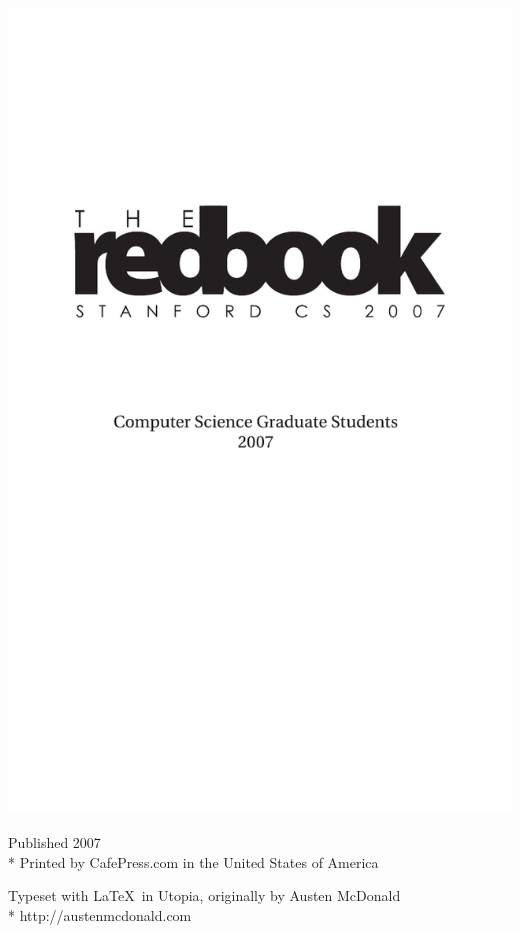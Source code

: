 \documentclass[10pt]{book}
\newenvironment{fullpage}{%
  \begin{list}{}{%
    \setlength{\topmargin}{-1in}
    \setlength{\textheight}{8in}
    \setlength{\topsep}{0pt}%
    \setlength{\leftmargin}{-.6in}%
    \setlength{\listparindent}{\parindent}%
    \setlength{\itemindent}{\parindent}%
    \setlength{\parsep}{\parskip}%
  }%
  \item[]}{\end{list}}
\begin{document}
\thispagestyle{empty}
\mbox{}
\newpage

\thispagestyle{empty}
\begin{fullpage}
\includegraphics{2007-redbook-titlepage.pdf}
\end{fullpage}
\vfil\eject

\vspace*{5in}
{\small
\noindent Published 2007\\*
Printed by CafePress.com in the United States of America

\noindent Typeset with \LaTeX\ in Utopia, originally by Austen McDonald\\*
http://austenmcdonald.com
}
\thispagestyle{empty}
\vfil\eject
\end{document}
